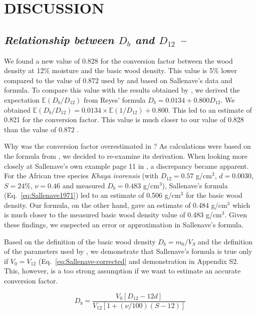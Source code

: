 \documentclass[a4paper, 12pt, leqno, dvipsnames]{article}\usepackage[]{graphicx}\usepackage[]{color}
\begin{document}
\newpage

\section*{DISCUSSION}

\subsection*{\textit{Relationship between $D_b$ and $D_{12}$ --}}

We found a new value of 0.828 for the conversion factor between the wood density at 12\% moisture and the basic wood density. This value is 5\% lower compared to the value of 0.872 used by \citet{Chave2006} and based on Sallenave's data and formula. To compare this value with the results obtained by \citet{Reyes1992}, we derived the expectation $\mathbb{E}(D_b/D_{12})$ from Reyes' formula $D_b = 0.0134 + 0.800 D_{12}$. We obtained $\mathbb{E}(D_b/D_{12}) = 0.0134 \times \mathbb{E}(1/D_{12}) + 0.800$. This led to an estimate of 0.821 for the conversion factor. This value is much closer to our value of 0.828 than the value of 0.872 \citep{Chave2006}. 

Why was the conversion factor overestimated in \citet{Chave2006}? As calculations were based on the formula from \citet{Sallenave1971}, we decided to re-examine its derivation. When looking more closely at Sallenave's own example page 11 in \citet{Sallenave1971}, a discrepancy became apparent. For the African tree species \emph{Khaya ivorensis} (with $D_{12}=0.57$ g/cm$^3$, $d=0.0030$, $S=24\%$, $\nu=0.46$ and measured $D_b=0.483$ g/cm$^3$), Sallenave's formula (Eq.~\ref{eq:Sallenave1971}) led to an estimate of 0.506 g/cm$^3$ for the basic wood density. Our formula, on the other hand, gave an estimate of 0.484 g/cm$^3$ which is much closer to the measured basic wood density value of 0.483 g/cm$^3$. Given these findings, we suspected an error or approximation in Sallenave's formula.

Based on the definition of the basic wood density $D_b=m_0/V_S$ and the definition of the parameters used by \citet{Sallenave1971}, we demonstrate that Sallenave's formula is true only if $V_0=V_{12}$ (Eq.~\ref{eq:Sallenave-corrected} and demonstration in Appendix S2. This, however, is a too strong assumption if we want to estimate an accurate conversion factor.

\begin{equation}
  D_b=\frac{V_0[D_{12} - 12 d]}{V_{12}[1+(\nu/100)(S-12)]}
  \label{eq:Sallenave-corrected}
\end{equation}
\end{document}
